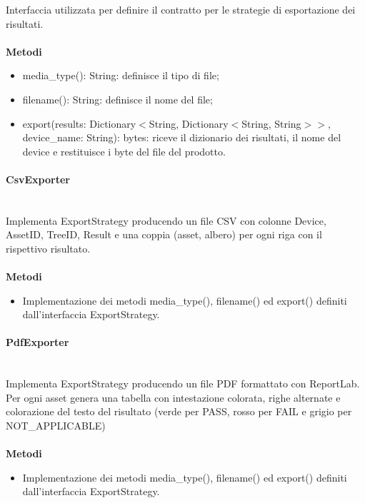 \documentclass[a4paper,12pt]{article}
\begin{document}
                    Interfaccia utilizzata per definire il contratto per le strategie di esportazione dei risultati.\\\\
                    \textbf{Metodi}
                    \begin{itemize}
                        \item {\ttfamily media\_type(): String}: definisce il tipo di file;
                        \item {\ttfamily filename(): String}: definisce il nome del file;
                        \item {\ttfamily export(results: Dictionary$<$String, Dictionary$<$String, String$>>$, device\_name: String): bytes}: riceve il dizionario dei risultati, il nome del device e restituisce i byte del file del prodotto.
                    \end{itemize}
                
                \paragraph{CsvExporter}\mbox{}\\
                    Implementa ExportStrategy producendo un file CSV con colonne Device, AssetID, TreeID, Result e una coppia (asset, albero) per ogni riga con il rispettivo risultato.\\\\
                    \textbf{Metodi}
                    \begin{itemize}
                        \item Implementazione dei metodi {\ttfamily media\_type()}, {\ttfamily filename()} ed {\ttfamily export()} definiti dall'interfaccia ExportStrategy.
                    \end{itemize}

                \paragraph{PdfExporter}\mbox{}\\
                    Implementa ExportStrategy producendo un file PDF formattato con ReportLab. Per ogni asset genera una tabella con intestazione colorata, righe alternate e colorazione del testo del risultato (verde per PASS, rosso per FAIL e grigio per NOT\_APPLICABLE)\\\\
                    \textbf{Metodi}
                    \begin{itemize}
                        \item Implementazione dei metodi {\ttfamily media\_type()}, {\ttfamily filename()} ed {\ttfamily export()} definiti dall'interfaccia ExportStrategy.
                    \end{itemize}   
                    
\end{document}
